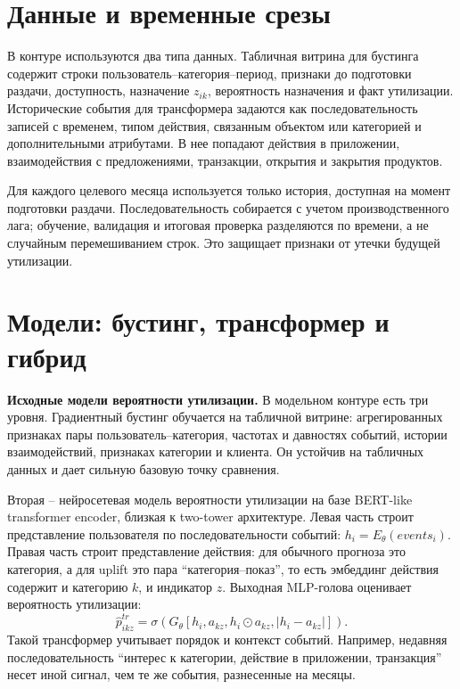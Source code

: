\documentclass[11pt,a4paper]{article}
\newcommand{\sigm}{\sigma}
\begin{document}
\section{Данные и временные срезы}

В контуре используются два типа данных. Табличная витрина для бустинга содержит строки пользователь--категория--период, признаки до подготовки раздачи, доступность, назначение $z_{ik}$, вероятность назначения и факт утилизации. Исторические события для трансформера задаются как последовательность записей с временем, типом действия, связанным объектом или категорией и дополнительными атрибутами. В нее попадают действия в приложении, взаимодействия с предложениями, транзакции, открытия и закрытия продуктов.

Для каждого целевого месяца используется только история, доступная на момент подготовки раздачи. Последовательность собирается с учетом производственного лага; обучение, валидация и итоговая проверка разделяются по времени, а не случайным перемешиванием строк. Это защищает признаки от утечки будущей утилизации.

\section{Модели: бустинг, трансформер и гибрид}

\textbf{Исходные модели вероятности утилизации.} В модельном контуре есть три уровня. Градиентный бустинг обучается на табличной витрине: агрегированных признаках пары пользователь--категория, частотах и давностях событий, истории взаимодействий, признаках категории и клиента. Он устойчив на табличных данных и дает сильную базовую точку сравнения.

Вторая -- нейросетевая модель вероятности утилизации на базе BERT-like transformer encoder, близкая к two-tower архитектуре. Левая часть строит представление пользователя по последовательности событий: $h_i=E_\theta(events_i)$. Правая часть строит представление действия: для обычного прогноза это категория, а для uplift это пара ``категория--показ'', то есть эмбеддинг действия содержит и категорию $k$, и индикатор $z$. Выходная MLP-голова оценивает вероятность утилизации:
\[
\hat p^{tr}_{ikz}=
\sigm\!\left(G_\theta\left[h_i,a_{kz},h_i\odot a_{kz},|h_i-a_{kz}|\right]\right).
\]
Такой трансформер учитывает порядок и контекст событий. Например, недавняя последовательность ``интерес к категории, действие в приложении, транзакция'' несет иной сигнал, чем те же события, разнесенные на месяцы.
\end{document}
